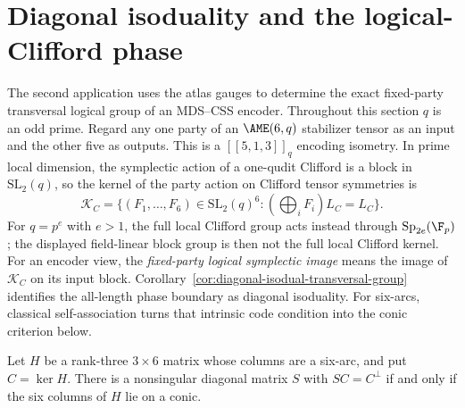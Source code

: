 \section{Diagonal isoduality and the logical-Clifford phase}
\label{sec:logical}

The second application uses the atlas gauges to determine the exact
fixed-party transversal logical group of an MDS--CSS encoder.
Throughout this section \(q\) is an odd prime.  Regard any one party of
an \(\AME(6,q)\) stabilizer tensor as an input and the other five as
outputs.  This is a \([[5,1,3]]_q\) encoding isometry.  In prime local
dimension, the symplectic action of a one-qudit Clifford is a block in
\(\mathrm{SL}_2(q)\), so the kernel of the party action on Clifford
tensor symmetries is
\[
 \mathcal K_C=\{(F_1,\ldots,F_6)\in\mathrm{SL}_2(q)^6:
                 (\bigoplus_iF_i)L_C=L_C\}.
\]
For \(q=p^e\) with \(e>1\), the full local Clifford group acts instead
through \(\mathrm{Sp}_{2e}(\F_p)\); the displayed field-linear block
group is then not the full local Clifford kernel.
For an encoder view, the \emph{fixed-party logical symplectic image} means
the image of \(\mathcal K_C\) on its input block.
Corollary~\ref{cor:diagonal-isodual-transversal-group} identifies the
all-length phase boundary as diagonal isoduality.  For six-arcs, classical
self-association turns that intrinsic code condition into the conic
criterion below.

\begin{lemma}\label{lem:six-arc-self-association}
Let \(H\) be a rank-three \(3\times6\) matrix whose columns are a
six-arc, and put \(C=\ker H\).  There is a nonsingular diagonal matrix
\(S\) with \(SC=C^\perp\) if and only if the six columns of \(H\) lie on
a conic.
\end{lemma}

